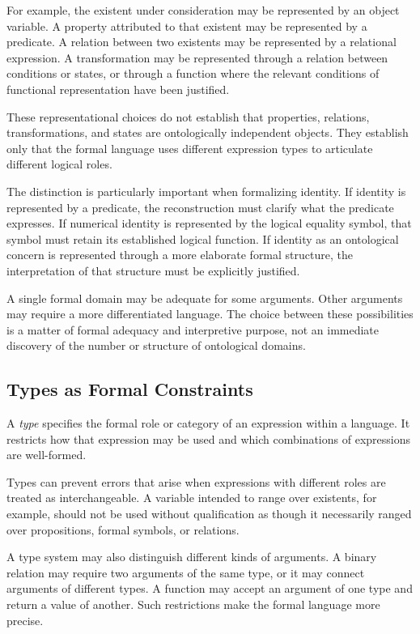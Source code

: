 For example, the existent under consideration
may be represented by an object variable.
A property attributed to that existent may
be represented by a predicate. A relation
between two existents may be represented
by a relational expression. A transformation
may be represented through a relation between
conditions or states, or through a function
where the relevant conditions of functional
representation have been justified.

These representational choices do not establish
that properties, relations, transformations,
and states are ontologically independent
objects. They establish only that the formal
language uses different expression types
to articulate different logical roles.

The distinction is particularly important
when formalizing identity. If identity is
represented by a predicate, the reconstruction
must clarify what the predicate expresses.
If numerical identity is represented by the
logical equality symbol, that symbol must
retain its established logical function.
If identity as an ontological concern is
represented through a more elaborate
formal structure, the interpretation of
that structure must be explicitly justified.

A single formal domain may be adequate for
some arguments. Other arguments may require
a more differentiated language. The choice
between these possibilities is a matter
of formal adequacy and interpretive purpose,
not an immediate discovery of the number
or structure of ontological domains.

\subsection{Types as Formal Constraints}

A \emph{type} specifies the formal role or
category of an expression within a language.
It restricts how that expression may be used
and which combinations of expressions are
well-formed.

Types can prevent errors that arise when
expressions with different roles are treated
as interchangeable. A variable intended to
range over existents, for example, should
not be used without qualification as though
it necessarily ranged over propositions,
formal symbols, or relations.

A type system may also distinguish different
kinds of arguments. A binary relation may
require two arguments of the same type,
or it may connect arguments of different
types. A function may accept an argument
of one type and return a value of another.
Such restrictions make the formal language
more precise.

